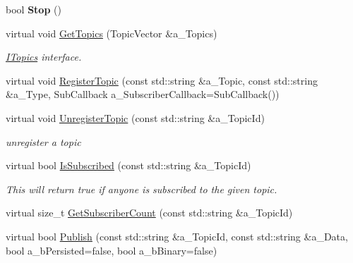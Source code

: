 \begin{DoxyCompactItemize}
\mbox{\label{class_topic_manager_a1f76f9178dab41fd99f9a8df153d0549}} 
bool {\bfseries Stop} ()
\item 
\mbox{\label{class_topic_manager_ae83a9d6fc33c274e73e832e08844040c}} 
virtual void \hyperlink{class_topic_manager_ae83a9d6fc33c274e73e832e08844040c}{Get\+Topics} (Topic\+Vector \&a\+\_\+\+Topics)
\begin{DoxyCompactList}\small\item\em \hyperlink{class_i_topics}{I\+Topics} interface. \end{DoxyCompactList}\item 
virtual void \hyperlink{class_topic_manager_a681e4ef90d13d2f0cca948135f4c8097}{Register\+Topic} (const std\+::string \&a\+\_\+\+Topic, const std\+::string \&a\+\_\+\+Type, Sub\+Callback a\+\_\+\+Subscriber\+Callback=Sub\+Callback())
\item 
\mbox{\label{class_topic_manager_a57e8a94646a9cdd60bfd8af0d355a7a0}} 
virtual void \hyperlink{class_topic_manager_a57e8a94646a9cdd60bfd8af0d355a7a0}{Unregister\+Topic} (const std\+::string \&a\+\_\+\+Topic\+Id)
\begin{DoxyCompactList}\small\item\em unregister a topic \end{DoxyCompactList}\item 
\mbox{\label{class_topic_manager_af57d892659d7e4006f85f890009dc158}} 
virtual bool \hyperlink{class_topic_manager_af57d892659d7e4006f85f890009dc158}{Is\+Subscribed} (const std\+::string \&a\+\_\+\+Topic\+Id)
\begin{DoxyCompactList}\small\item\em This will return true if anyone is subscribed to the given topic. \end{DoxyCompactList}\item 
virtual size\+\_\+t \hyperlink{class_topic_manager_a7dd5e9041ac8f297f9695adf576beed0}{Get\+Subscriber\+Count} (const std\+::string \&a\+\_\+\+Topic\+Id)
\item 
\mbox{\label{class_topic_manager_a3aa590170f26a39fb5d22dbf753da2ad}} 
virtual bool \hyperlink{class_topic_manager_a3aa590170f26a39fb5d22dbf753da2ad}{Publish} (const std\+::string \&a\+\_\+\+Topic\+Id, const std\+::string \&a\+\_\+\+Data, bool a\+\_\+b\+Persisted=false, bool a\+\_\+b\+Binary=false)

\end{DoxyCompactItemize}
